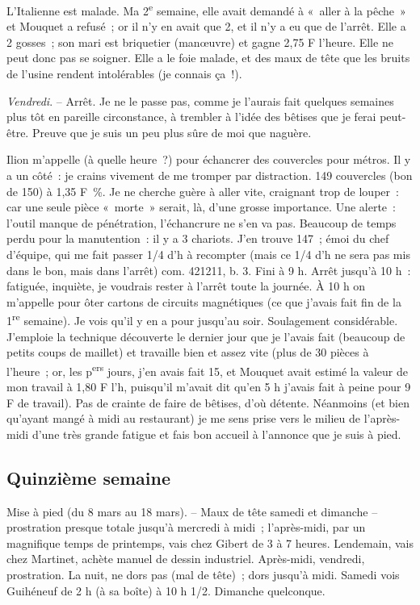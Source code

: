 \documentclass[french,twoside]{book} %
\begin{document}
L'Italienne est malade. Ma 2\textsuperscript{e} semaine, elle avait demandé à « aller à la pêche » et Mouquet a refusé ; or il n'y en avait que 2, et il n'y a eu que de l'arrêt. Elle a 2 gosses ; son mari est briquetier (manœuvre) et gagne 2,75 F l'heure. Elle ne peut donc pas se soigner. Elle a le foie malade, et des maux de tête que les bruits de l'usine rendent intolérables (je connais ça !).\par
{\itshape Vendredi}. – Arrêt. Je ne le passe pas, comme je l'aurais fait quelques semaines plus tôt en pareille circonstance, à trembler à l'idée des bêtises que je ferai peut-être. Preuve que je suis un peu plus sûre de moi que naguère.\par
Ilion m'appelle (à quelle heure ?) pour échancrer des couvercles pour métros. Il y a un côté : je crains vivement de me tromper par distraction. 149 couvercles (bon de 150) à 1,35 F \%. Je ne cherche guère à aller vite, craignant trop de louper : car une seule pièce « morte » serait, là, d'une grosse importance. Une alerte : l'outil manque de pénétration, l'échancrure ne s'en va pas. Beaucoup de temps perdu pour la manutention : il y a 3 chariots. J'en trouve 147 ; émoi du chef d'équipe, qui me fait passer 1/4 d'h à recompter (mais ce 1/4 d'h ne sera pas mis dans le bon, mais dans l'arrêt) com. 421211, b. 3. Fini à 9 h. Arrêt jusqu'à 10 h : fatiguée, inquiète, je voudrais rester à l'arrêt toute la journée. À 10 h on m'appelle pour ôter cartons de circuits magnétiques (ce que j'avais fait fin de la 1\textsuperscript{re} semaine). Je vois qu'il y en a pour jusqu'au soir. Soulagement considérable. J'emploie la technique découverte le dernier jour que je l'avais fait (beaucoup de petits coups de maillet) et travaille bien et assez vite (plus de 30 pièces à l'heure ; or, les p\textsuperscript{ers} jours, j'en avais fait 15, et Mouquet avait estimé la valeur de mon travail à 1,80 F l'h, puisqu'il m'avait dit qu'en 5 h j'avais fait à peine pour 9 F de travail). Pas de crainte de faire de bêtises, d'où détente. Néanmoins (et bien qu'ayant mangé à midi au restaurant) je me sens prise vers le milieu de l'après-midi d'une très grande fatigue et fais bon accueil à l'annonce que je suis à pied.
\subsection[Quinzième semaine]{Quinzième semaine}
\noindent \par
Mise à pied (du 8 mars au 18 mars). – Maux de tête samedi et dimanche – prostration presque totale jusqu'à mercredi à midi ; l'après-midi, par un magnifique temps de printemps, vais chez Gibert de 3 à 7 heures. Lendemain, vais chez Martinet, achète manuel de dessin industriel. Après-midi, vendredi, prostration. La nuit, ne dors pas (mal de tête) ; dors jusqu'à midi. Samedi vois Guihéneuf de 2 h (à sa boîte) à 10 h 1/2. Dimanche quelconque.
\end{document}
